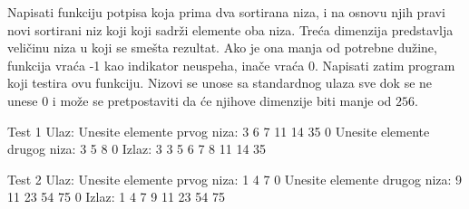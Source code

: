 \begin{Answer}[ref=504]
\end{Answer}
\begin{Exercise}[label=505]
  Napisati funkciju potpisa  koja prima dva sortirana
  niza, i na osnovu njih pravi novi sortirani niz koji koji sadrži
  elemente oba niza. Treća dimenzija predstavlja veličinu niza u koji
  se smešta rezultat. Ako je ona manja od potrebne dužine, funkcija
  vraća -1 kao indikator neuspeha, inače vraća 0. Napisati zatim program
  koji testira ovu funkciju. Nizovi se unose sa standardnog ulaza sve dok se ne unese 0 i 
  može se pretpostaviti da će njihove dimenzije biti manje od $256$.
  
\begin{miditest}
\begin{test}{Test 1}
Ulaz:   
Unesite elemente prvog niza: 
3 6 7 11 14 35 0 
Unesite elemente drugog niza: 
3 5 8 0
Izlaz:  
3 3 5 6 7 8 11 14 35
\end{test}
\end{miditest}
\begin{miditest}
\begin{test}{Test 2}
Ulaz:   
Unesite elemente prvog niza:
1 4 7 0 
Unesite elemente drugog niza: 
9 11 23 54 75 0
Izlaz:  
1 4 7 9 11 23 54 75
\end{test}
\end{miditest}
  
\end{Exercise}

